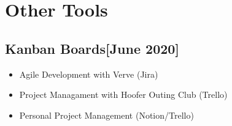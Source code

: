 \documentclass{article}
\begin{document}
\section{Other Tools}

    \subsection{\textbf{Kanban Boards}\hfill{[June 2020]}}
        \begin{itemize}
            \item Agile Development with Verve (Jira)
            \item Project Managament with Hoofer Outing Club (Trello)
            \item Personal Project Management (Notion/Trello)
        \end{itemize}
\end{document}

